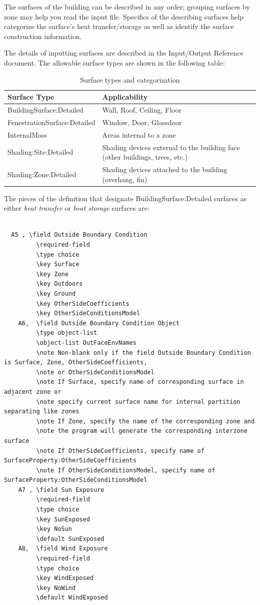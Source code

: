 The surfaces of the building can be described in any order; grouping surfaces by zone may help you read the input file. Specifics of the describing surfaces help categorize the surface's heat transfer/storage as well as identify the surface construction information.

The details of inputting surfaces are described in the Input/Output Reference document. The allowable surface types are shown in the following table:

\begin{longtable}[c]{p{1.61in}p{4.38in}}
\caption{Surface types and categorization \protect \label{table:surface-types-and-categorization}}\\
\toprule 
Surface Type & Applicability \tabularnewline \midrule
\endhead
BuildingSurface:Detailed & Wall, Roof, Ceiling, Floor \tabularnewline
FenestrationSurface:Detailed & Window, Door, Glassdoor \tabularnewline
InternalMass & Areas internal to a zone \tabularnewline
Shading:Site:Detailed & Shading devices external to the building face (other buildings, trees, etc.) \tabularnewline
Shading:Zone:Detailed & Shading devices attached to the building (overhang, fin) \tabularnewline
\bottomrule
\end{longtable}

The pieces of the definition that designate BuildingSurface:Detailed surfaces as either \emph{heat transfer} or \emph{heat storage} surfaces are:

\begin{lstlisting}

  A5 , \field Outside Boundary Condition
         \required-field
         \type choice
         \key Surface
         \key Zone
         \key Outdoors
         \key Ground
         \key OtherSideCoefficients
         \key OtherSideConditionsModel
    A6,  \field Outside Boundary Condition Object
         \type object-list
         \object-list OutFaceEnvNames
         \note Non-blank only if the field Outside Boundary Condition is Surface, Zone, OtherSideCoefficients,
         \note or OtherSideConditionsModel
         \note If Surface, specify name of corresponding surface in adjacent zone or
         \note specify current surface name for internal partition separating like zones
         \note If Zone, specify the name of the corresponding zone and
         \note the program will generate the corresponding interzone surface
         \note If OtherSideCoefficients, specify name of SurfaceProperty:OtherSideCoefficients
         \note If OtherSideConditionsModel, specify name of SurfaceProperty:OtherSideConditionsModel
    A7 , \field Sun Exposure
         \required-field
         \type choice
         \key SunExposed
         \key NoSun
         \default SunExposed
    A8,  \field Wind Exposure
         \required-field
         \type choice
         \key WindExposed
         \key NoWind
         \default WindExposed
\end{lstlisting}

